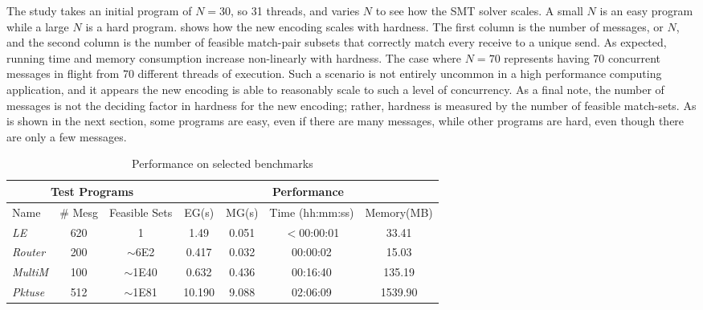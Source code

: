 The study takes an initial program of $N = 30$, so 31 threads, and varies $N$ to see how the SMT solver scales. A small $N$ is an easy program while a large $N$ is a hard program.  shows how the new encoding scales with hardness. The first column is the number of messages, or $N$, and the second column is the number of feasible match-pair subsets that correctly match every receive to a unique send. As expected, running time and memory consumption increase non-linearly with hardness. The case where $N=70$ represents having 70 concurrent messages in flight from 70 different threads of execution. Such a scenario is not entirely uncommon in a high performance computing application, and it appears the new encoding is able to reasonably scale to such a level of concurrency. As a final note, the number of messages is not the deciding factor in hardness for the new encoding; rather, hardness is measured by the number of feasible match-sets. As is shown in the next section, some programs are easy, even if there are many messages, while other programs are hard, even though there are only a few messages.

\begin{table}
\begin{center}
\setlength{\tabcolsep}{2pt}
\scriptsize
\caption{Performance on selected benchmarks}
\begin{tabular}{|l|c|c|c|c|c|c|}
		\hline
         \multicolumn{3}{|c|}{Test Programs} & \multicolumn{4}{|c|}{Performance} \\ \hline
         Name & \# Mesg & Feasible Sets & EG(s) & MG(s) & Time (hh:mm:ss) & Memory(MB) \\ \hline
         \textit{LE} & 620 & 1 & 1.49 & 0.051 & $<$00:00:01 & 33.41  \\ %
         \textit{Router} & 200 & $\sim$6E2 & 0.417 & 0.032 & 00:00:02 & 15.03  \\ %
         \textit{MultiM} & 100 & $\sim$1E40 & 0.632 & 0.436 &  00:16:40 & 135.19  \\ %
         \textit{Pktuse} & 512 & $\sim$1E81 & 10.190 & 9.088 & 02:06:09 & 1539.90 \\ %
         \hline
		\end{tabular}
\end{center}
\label{table:second}
\end{table}

